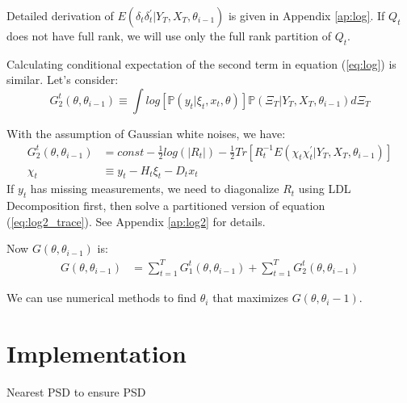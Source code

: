 \documentclass[12pt]{article}
\numberwithin{equation}{section}
\begin{document}
Detailed derivation of $E(\delta_t\delta_t^{'}|Y_T,X_T,\theta_{i-1})$ is given in Appendix \ref{ap:log}. If $Q_t$ does not have full rank, we will use only the full rank partition of $Q_t$. 

Calculating conditional expectation of the second term in equation (\ref{eq:log}) is similar. Let's consider:
\[
    G_2^t(\theta,\theta_{i-1}) \equiv \int log[\mathbb{P}(y_t|\xi_{t},x_t, \theta)]\mathbb{P}(\Xi_T|Y_T,X_T,\theta_{i-1})d\Xi_T 
\]

With the assumption of Gaussian white noises, we have:
\begin{align}
    G_2^t(\theta,\theta_{i-1}) &= const - \frac{1}{2}log(|R_t|)-\frac{1}{2}Tr[R_t^{-1}E(\chi_t\chi_t^{'}|Y_T,X_T,\theta_{i-1})] \label{eq:log2_trace} \\
    \chi_t &\equiv y_t - H_t\xi_t - D_tx_t \nonumber
\end{align}
If $y_t$ has missing measurements, we need to diagonalize $R_t$ using LDL Decomposition first, then solve a partitioned version of equation (\ref{eq:log2_trace}). See Appendix \ref{ap:log2} for details.

Now $G(\theta,\theta_{i-1})$ is:
\begin{align}
    G(\theta,\theta_{i-1}) &= \sum_{t=1}^{T}G_1^t(\theta,\theta_{i-1}) + \sum_{t=1}^{T}G_2^t(\theta,\theta_{i-1}) \label{eq:final_mle}
\end{align}

We can use numerical methods to find $\theta_i$ that maximizes $G(\theta,\theta_i-1)$.
\section{Implementation} \label{sec:implement}
Nearest PSD to ensure PSD
\end{document}
